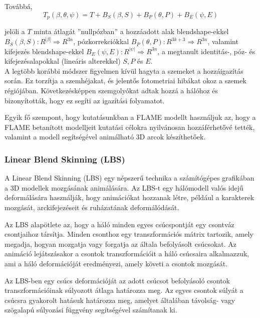\documentclass[12pt,a4]{article}
\begin{document}
                Továbbá, 
                \begin{equation*}
                    T_{p}(\beta, \theta, \psi) = T + B_{S}(\beta, S) + B_{P}(\theta, P) + B_{E}(\psi, E)
                \end{equation*}

                jelöli a $T$ minta átlagát ”nullpózban” a hozzáadott alak blendshape-ekkel $B_{S} (\beta, S) : R^{|\beta|} \Rightarrow R^{3n}$, pózkorrekciókkal $B_{P}(\theta, P) : R^{3k+3} \Rightarrow R^{3n}$, valamint kifejezés blendshape-ekkel $B_{E}(\psi, E) : R^{|\psi|} \Rightarrow R^{3n}$, a megtanult identitás-, póz- és kifejezésalapokkal (lineáris alterekkel) $S, P$ és $E$. \\

                A legtöbb korábbi módszer figyelmen kívül hagyta a szemeket a
                hozzáigazítás során. Ez torzítja a szemhéjakat, és jelentős fotometriai hibákat okoz a szemek régiójában. Következésképpen szemgolyókat adtak hozzá a hálóhoz és bizonyították, hogy ez segíti az igazítási folyamatot.

                Egyik fő szempont, hogy kutatásunkban a FLAME modellt használjuk az, hogy a FLAME betanított modelljeit kutatási célokra nyilvánosan hozzáférhetővé tették, valamint a modell segítségével animálható 3D arcok készíthetőek.

            \subsubsection{Linear Blend Skinning (LBS)}

                A Linear Blend Skinning (LBS) egy népszerű technika a számítógépes grafikában a 3D modellek mozgásának animálására. Az LBS-t egy hálómodell valós idejű deformálására használják, hogy animációkat hozzanak létre, például a karakterek mozgását, arckifejezéseit és ruházatának deformálódását.

                Az LBS alapötlete az, hogy a háló minden egyes csúcspontját egy csontváz csontjaihoz társítja. Minden csonthoz egy transzformációs mátrix tartozik, amely megadja, hogyan mozgatja vagy forgatja az általa befolyásolt csúcsokat. Az animáció lejátszásakor a csontok transzformációit a háló csúcsaira alkalmazzuk, ami a háló deformációját eredményezi, amely követi a csontok mozgását.
                
                Az LBS-ben egy csúcs deformációját az adott csúcsot befolyásoló csontok transzformációinak súlyozott átlaga határozza meg. Az egyes csontok súlyát a csúcsra gyakorolt hatásuk határozza meg, amelyet általában távolság- vagy szögalapú súlyozási függvény segítségével számítanak ki.
                
\end{document}
